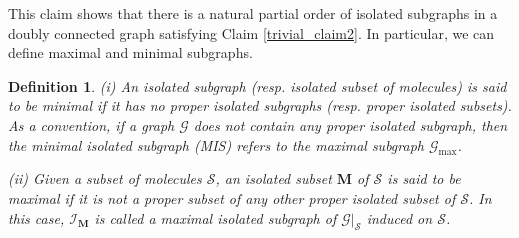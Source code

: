 \documentclass{article}
\newcommand{\1}{\mathds{1}}
\numberwithin{equation}{section}
\renewcommand{\cal}{\mathcal}
\theoremstyle{plain} %
\newtheorem{definition}[theorem]{Definition}
\theoremstyle{remark}
\newcommand{\Pol}{{\mathbf{M}}}
\newcommand{\Iso}{{\mathcal I}}
\begin{document}
This claim shows that there is a natural partial order of isolated subgraphs in a doubly connected graph satisfying Claim \ref{trivial_claim2}. In particular, we can define maximal and minimal subgraphs.
\begin{definition}\label{defn_min_iso}
(i) An isolated subgraph (resp. isolated subset of molecules) is said to be \emph{minimal} if it has no proper isolated subgraphs (resp. proper isolated subsets). As a convention, if a graph $\cal G$ does not contain any proper isolated subgraph, then the minimal isolated subgraph (MIS) refers to the maximal subgraph $\cal G_{\max}$.  

\vspace{5pt}

\noindent (ii) Given a subset of molecules $\cal S$, an isolated subset $\Pol$ of $\cal S$ is said to be \emph{maximal} if it is not a proper subset of any other proper isolated subset of $\cal S$. In this case, $\Iso_{\Pol}$ is called a  maximal isolated subgraph of $ {\cal G}|_{\cal S}$ induced on $\cal S$. 
\end{definition}
%
\end{document}
